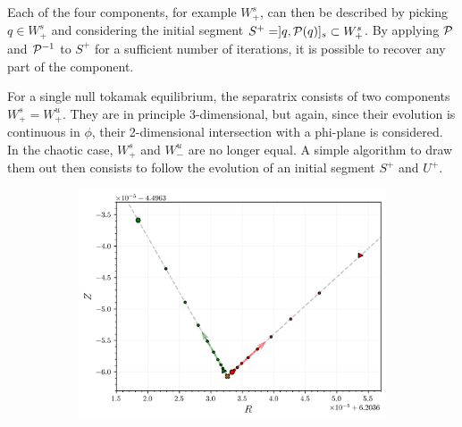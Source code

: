 Each of the four components, for example $W^s_+$, can then be described by picking $q \in W^s_+$ and considering the initial segment $S^+ = ]q,\mathcal{P}(q)]_s \subset W^s_+$. By applying $\mathcal{P}$ and $\mathcal{P}^{-1}$ to $S^+$ for a sufficient number of iterations, it is possible to recover any part of the component.

For a single null tokamak equilibrium, the separatrix consists of two components $W^s_+ = W^u_+$. They are in principle 3-dimensional, but again, since their evolution is continuous in $\phi$, their 2-dimensional intersection with a phi-plane is considered. In the chaotic case, $W^s_+$ and $W^u_-$ are no longer equal. A simple algorithm to draw them out then consists to follow the evolution of an initial segment $S^+$ and $U^+$.

\begin{figure}[H]
    \centering
    \begin{minipage}{0.45\textwidth} %
        \centering
        \begin{subfigure}[b]{\textwidth}
            \centering
            \includegraphics[width=\textwidth]{images/manifold/manifold_start.png}
            \caption{}
            \label{fig:man-a}
        \end{subfigure}
        \vfill
        \vspace{10px}
        \vfill
        \begin{subfigure}[b]{0.99\textwidth}
            \centering

\end{subfigure}
\end{minipage}
\end{figure}
